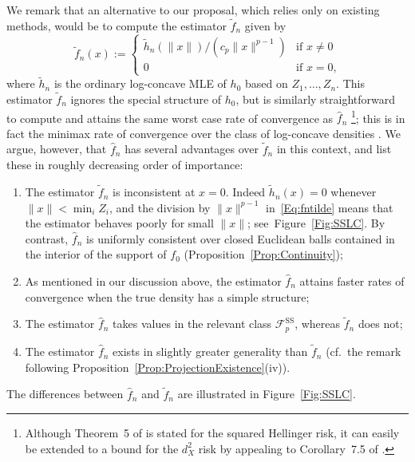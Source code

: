 \documentclass[a4paper,12pt]{article}
\begin{document}
We remark that an alternative to our proposal, which relies only on existing methods, would be to compute the estimator $\tilde{f}_n$ given by
\begin{equation}
\label{Eq:fntilde}
\tilde{f}_n(x) := \left\{ \begin{array}{ll} \tilde{h}_n(\|x\|)/(c_p\|x\|^{p-1}) & \mbox{if $x \neq 0$} \\
0 & \mbox{if $x=0$,} \end{array} \right. 
\end{equation}
where $\tilde{h}_n$ is the ordinary log-concave MLE of $h_0$ based on $Z_1,\ldots,Z_n$.  This estimator $\tilde{f}_n$ ignores the special structure of $h_0$, but is similarly straightforward to compute and attains the same worst case rate of convergence as $\hat{f}_n$ \citep[][Theorem~5]{kim2016global}\footnote{Although Theorem~5 of \citet{kim2016global} is stated for the squared Hellinger risk, it can easily be extended to a bound for the $d_X^2$ risk by appealing to Corollary~7.5 of \citet{vandegeer2000empirical}.}; this is in fact the minimax rate of convergence over the class of log-concave densities \citep[][Theorem~1]{kim2016global}.  We argue, however, that $\hat{f}_n$ has several advantages over $\tilde{f}_n$ in this context, and list these in roughly decreasing order of importance:
\begin{enumerate}
\item The estimator $\tilde{f}_n$ is inconsistent at $x=0$.  Indeed $\tilde{h}_n(x) = 0$ whenever $\|x\| < \min_i Z_i$, and the division by $\|x\|^{p-1}$ in~\eqref{Eq:fntilde} means that the estimator behaves poorly for small $\|x\|$; see~Figure~\ref{Fig:SSLC}.  By contrast, $\hat{f}_n$ is uniformly consistent over closed Euclidean balls contained in the interior of the support of $f_0$ (Proposition~\ref{Prop:Continuity});
\item As mentioned in our discussion above, the estimator $\hat{f}_n$ attains faster rates of convergence when the true density has a simple structure;
\item The estimator $\hat{f}_n$ takes values in the relevant class $\mathcal{F}_p^{\mathrm{SS}}$, whereas $\tilde{f}_n$ does not;
\item The estimator $\hat{f}_n$ exists in slightly greater generality than $\tilde{f}_n$ (cf.~the remark following Proposition~\ref{Prop:ProjectionExistence}(iv)).
\end{enumerate}
The differences between $\hat{f}_n$ and $\tilde{f}_n$ are illustrated in Figure~\ref{Fig:SSLC}.  
\end{document}
